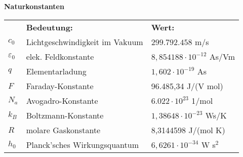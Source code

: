 \textbf{Naturkonstanten}
\begin{longtable}{p{1cm}p{6cm}p{6cm}}
						&\textbf{Bedeutung:}		& \textbf{Wert:} \\
		$c_0$					& Lichtgeschwindigkeit im Vakuum	& $299.792.458$ m/s \\
		$\varepsilon_0$	& elek. Feldkonstante							& $8,854188 \cdot 10^{-12}$ As/Vm \\
		$q$						& Elementarladung									& $1,602 \cdot 10^{-19}$ As \\
		$F$						& Faraday-Konstante								& 96.485,34 J/(V mol)\\
		$N_a$					& Avogadro-Konstante							& $6.022 \cdot 10^{23}$ 1/mol \\
		$k_B$					& Boltzmann-Konstante							& $1,38648 \cdot 10^{-23}$ Ws/K \\
		$R$						& molare Gaskonstante							& 8,3144598 J/(mol K)\\
		$h_0$					& Planck'sches Wirkungsquantum		& $6,6261 \cdot 10^{-34}$ W s$^{2}$  \\	
\end{longtable}
